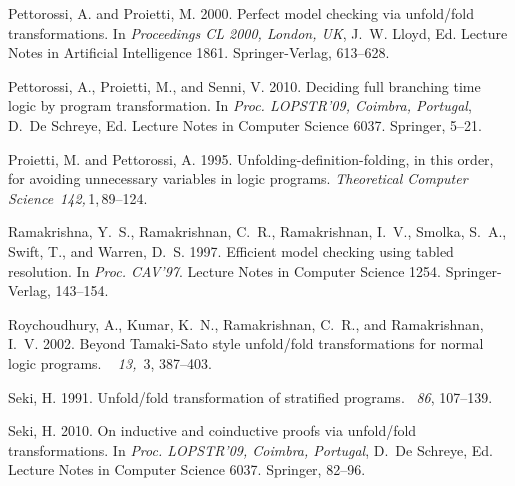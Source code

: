 \documentclass[english]{tlp}
\begin{document}
\begin{thebibliography}{}
{\sc Pettorossi, A.} {\sc and} {\sc Proietti, M.} 2000.
\newblock Perfect model checking via unfold/fold transformations.
\newblock In {\em Proceedings CL 2000, London, UK}, {J.~W. Lloyd}, Ed.
  Lecture Notes in Artificial Intelligence 1861. Springer-Verlag, 613--628.

{\sc Pettorossi, A.}, {\sc Proietti, M.}, {\sc and} {\sc Senni, V.} 2010.
\newblock Deciding full branching time logic by program transformation.
\newblock In {\em Proc. LOPSTR'09,
  Coimbra, Portugal}, {D.~{De Schreye}}, Ed. 
  Lecture Notes in Computer Science 6037. Springer, 5--21.

{\sc Proietti, M.} {\sc and} {\sc Pettorossi, A.} 1995.
\newblock Unfolding-definition-folding, in this order, for avoiding unnecessary
  variables in logic pro\-grams.
{\em Theoretical Computer Science\/}~{\em 142,\/}\,1,\,89--124.

{\sc Ramakrishna, Y.~S.}, {\sc Ramakrishnan, C.~R.}, {\sc Ramakrishnan, I.~V.},
  {\sc Smolka, S.~A.}, {\sc Swift, T.}, {\sc and} {\sc Warren, D.~S.} 1997.
\newblock Efficient model checking using tabled resolution.
\newblock In {\em Proc. CAV'97}. Lecture Notes in Computer Science 1254.
  Springer-Verlag, 143--154.

{\sc Roychoudhury, A.}, {\sc Kumar, K.~N.}, {\sc Ramakrishnan, C.~R.}, {\sc
  and} {\sc Ramakrishnan, I.~V.} 2002.
\newblock Beyond {T}amaki-{S}ato style unfold/fold transformations for normal
  logic programs.
~{\em
  13,\/}~3, 387--403.

{\sc Seki, H.} 1991.
\newblock Unfold/fold trans\-form\-ation of stratified pro\-grams.
~{\em 86}, 107--139.

{\sc Seki, H.} 2010.
\newblock On inductive and coinductive proofs via unfold/fold transformations.
\newblock In {\em Proc. LOPSTR'09,
  Coimbra, Portugal}, {D.~{De Schreye}}, Ed.  
  Lecture Notes in Computer Science 6037. Springer, 82--96.


\end{thebibliography}
\end{document}
